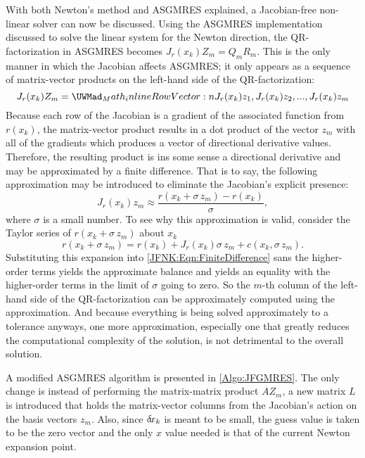 \documentclass[12pt]{UWMadThesis}
\begin{document}
With both Newton's method and ASGMRES explained, a Jacobian-free non-linear solver can now be discussed.
Using the ASGMRES implementation discussed to solve the linear system for the Newton direction, the QR-factorization in ASGMRES becomes $J_r(x_k) Z_m = Q_m R_m$.
This is the only manner in which the Jacobian affects ASGMRES; it only appears as a sequence of matrix-vector products on the left-hand side of the QR-factorization:
\begin{equation}
    J_r(x_k) Z_m = \irowvec{J_r(x_k)z_1,J_r(x_k)z_2,...,J_r(x_k)z_m}
\end{equation}
Because each row of the Jacobian is a gradient of the associated function from $r(x_k)$, the matrix-vector product results in a dot product of the vector $z_m$ with all of the gradients which produces a vector of directional derivative values.
Therefore, the resulting product is ins some sense a directional derivative and may be approximated by a finite difference.
That is to say, the following approximation may be introduced to eliminate the Jacobian's explicit presence:
\begin{equation}
    J_r(x_k)z_m \approx \frac{r(x_k + \sigma\,z_m) - r(x_k)}{\sigma},
    \label{JFNK:Eqn:FiniteDifference}
\end{equation}
where $\sigma$ is a small number.
To see why this approximation is valid, consider the Taylor series of $r(x_k + \sigma\,z_m)$ about $x_k$
\begin{equation}
    r(x_k + \sigma\,z_m) = r(x_k) + J_r(x_k)\sigma\,z_m + c(x_k,\sigma\,z_m).
\end{equation}
Substituting this expansion into \cref{JFNK:Eqn:FiniteDifference} sans the higher-order terms yields the approximate balance and yields an equality with the higher-order terms in the limit of $\sigma$ going to zero.
So the $m$-th column of the left-hand side of the QR-factorization can be approximately computed using the approximation.
And because everything is being solved approximately to a tolerance anyways, one more approximation, especially one that greatly reduces the computational complexity of the solution, is not detrimental to the overall solution.

A modified ASGMRES algorithm is presented in \cref{Algo:JFGMRES}.
The only change is instead of performing the matrix-matrix product $A Z_m$, a new matrix $L$ is introduced that holds the matrix-vector columns from the Jacobian's action on the basis vectors $z_m$.
Also, since $\delta \mkern-3.00mu x_k$ is meant to be small, the guess value is taken to be the zero vector and the only $x$ value needed is that of the current Newton expansion point.
\end{document}
